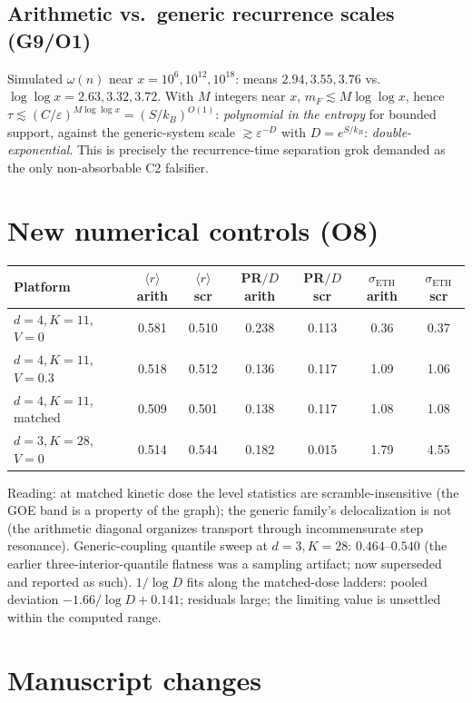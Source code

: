 \documentclass[11pt,a4paper]{article}
\begin{document}
\subsection{Arithmetic vs.\ generic recurrence scales (G9/O1)}
Simulated $\omega(n)$ near $x=10^{6},10^{12},10^{18}$: means $2.94,3.55,3.76$
vs.\ $\log\log x=2.63,3.32,3.72$. With $M$ integers near $x$,
$m_F\lesssim M\log\log x$, hence
$\tau\lesssim(C/\varepsilon)^{M\log\log x}=(S/k_B)^{O(1)}$: \emph{polynomial in
the entropy} for bounded support, against the generic-system scale
$\gtrsim\varepsilon^{-D}$ with $D=e^{S/k_B}$: \emph{double-exponential}. This
is precisely the recurrence-time separation grok demanded as the only
non-absorbable C2 falsifier.

\section{New numerical controls (O8)}

\begin{center}
\begin{tabular}{@{}lcccccc@{}}
\toprule
Platform & $\langle r\rangle$ arith & $\langle r\rangle$ scr &
PR$/D$ arith & PR$/D$ scr & $\sigma_{\mathrm{ETH}}$ arith &
$\sigma_{\mathrm{ETH}}$ scr\\
\midrule
$d=4,K=11$, $V=0$ & 0.581 & 0.510 & 0.238 & 0.113 & 0.36 & 0.37\\
$d=4,K=11$, $V=0.3$ & 0.518 & 0.512 & 0.136 & 0.117 & 1.09 & 1.06\\
$d=4,K=11$, matched & 0.509 & 0.501 & 0.138 & 0.117 & 1.08 & 1.08\\
$d=3,K=28$, $V=0$ & 0.514 & 0.544 & 0.182 & 0.015 & 1.79 & 4.55\\
\bottomrule
\end{tabular}
\end{center}

Reading: at matched kinetic dose the level statistics are scramble-insensitive
(the GOE band is a property of the graph); the generic family's
delocalization is not (the arithmetic diagonal organizes transport through
incommensurate step resonance). Generic-coupling quantile sweep at
$d=3,K=28$: $0.464$--$0.540$ (the earlier three-interior-quantile flatness was
a sampling artifact; now superseded and reported as such). $1/\log D$ fits
along the matched-dose ladders: pooled deviation
$-1.66/\log D+0.141$; residuals large; the limiting value is unsettled within
the computed range.

\section{Manuscript changes}
\end{document}
